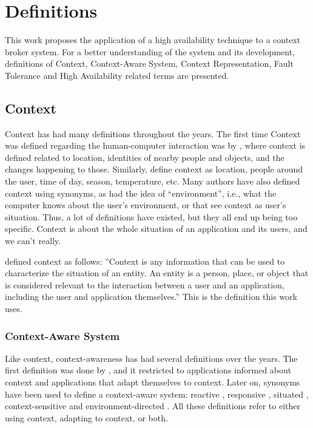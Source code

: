 \chapter{Definitions}
\label{chap:definitions}
This work proposes the application of a high availability technique to a context broker system. For a better understanding of the system and its development, definitions of Context, Context-Aware System, Context Representation, Fault Tolerance and High Availability related terms are presented.

\section{Context}
\label{sec:context}

Context has had many definitions throughout the years. The first time Context was defined regarding the human-computer interaction was by \cite{schilit1994disseminating}, where context is defined related to location, identities of nearby people and objects, and the changes happening to those.  Similarly, \cite{brown1997context} define context as location, people around the user, time of day, season, temperature, etc. Many authors have also defined context using synonyms, as \cite{brown1995stick} had the idea of “environment”, i.e., what the computer knows about the user's environment, or \cite{franklin1998all} that see context as user's situation. Thus, a lot of definitions have existed, but they all end up being too specific. Context is about the whole situation of an application and its users, and we can't really.

\cite{dey2000providing} defined context as follows: ''Context is any information that can be used to characterize the situation of an entity. An entity is a person, place, or object that is considered relevant to the interaction between a user and an application, including the user and application themselves.'' This is the definition this work uses.

\subsection{Context-Aware System}
Like context, context-awareness has had several definitions over the years. The first definition was done by \cite{schilit1994disseminating}, and it restricted to applications informed about context and applications that adapt themselves to context. Later on, synonyms have been used to define a context-aware system: reactive \cite{cooperstock1995evolution}, responsive \cite{elrod1993responsive}, situated \cite{hull1997towards}, context-sensitive  \cite{rekimoto1998augment} and environment-directed \cite{fickas1997software}. All these definitions refer to either using context, adapting to context, or both.

